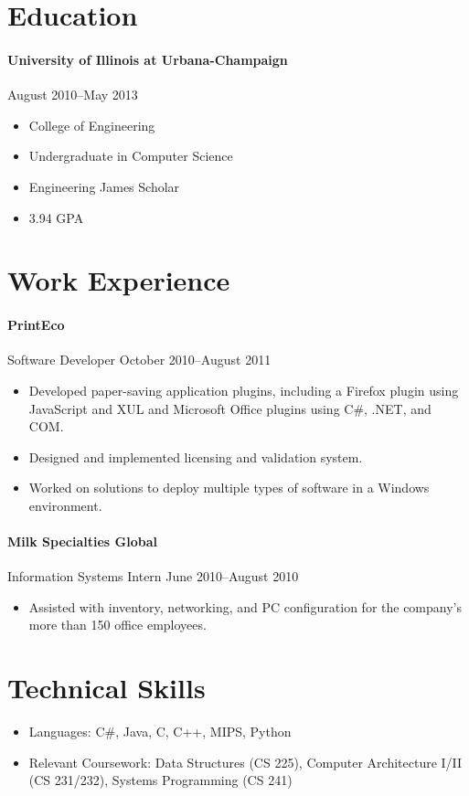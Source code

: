 \documentclass[letterpaper,12pt]{article}
\begin{document}
\section*{Education}
\paragraph{University of Illinois at Urbana-Champaign}
\hfill August 2010--May 2013
\begin{multicols}{2}
\begin{itemize}
\item College of Engineering
\item Undergraduate in Computer Science
\item Engineering James Scholar
\item 3.94 GPA
\end{itemize}
\end{multicols}

\section*{Work Experience}
\paragraph{PrintEco}
Software Developer \hfill October 2010--August 2011
\begin{itemize}
\item Developed paper-saving application plugins,
including a Firefox plugin using JavaScript and XUL
and Microsoft Office plugins using C\#, .NET, and COM.
\item Designed and implemented licensing and validation system.
\item Worked on solutions to deploy multiple types of software
in a Windows environment.
\end{itemize}

\paragraph {Milk Specialties Global}
Information Systems Intern \hfill June 2010--August 2010
\begin{itemize}
\item Assisted with inventory, networking, and PC configuration
for the company's more than 150 office employees.
\end{itemize}

\section*{Technical Skills}
\begin{itemize}
\item Languages: C\#, Java, C, C++, MIPS, Python
\item Relevant Coursework: Data Structures (CS 225),
Computer Architecture I/II (CS 231/232), Systems Programming (CS 241)
\end{itemize}
\end{document}
